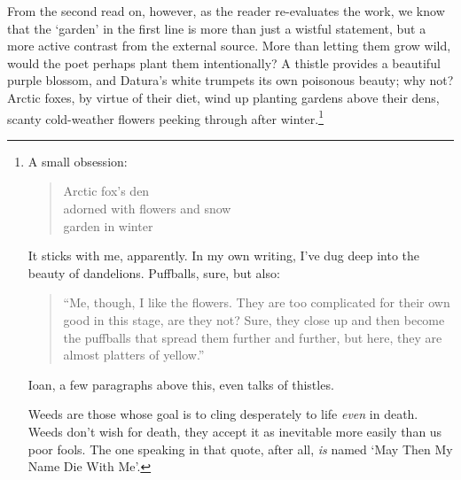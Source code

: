 \documentclass[12pt,oneside]{memoir}
\begin{document}
From the second read on, however, as the reader re-evaluates the work, we know that the `garden' in the first line is more than just a wistful statement, but a more active contrast from the external source. More than letting them grow wild, would the poet perhaps plant them intentionally? A thistle provides a beautiful purple blossom, and Datura's white trumpets its own poisonous beauty; why not? Arctic foxes, by virtue of their diet, wind up planting gardens above their dens, scanty cold-weather flowers peeking through after winter.\footnote{A small obsession:\begin{verse}Arctic fox's den \\
adorned with flowers and snow \\
garden in winter\par
\parencite{arkie}
\end{verse}\par
It sticks with me, apparently. In my own writing, I've dug deep into the beauty of dandelions. Puffballs, sure, but also:\begin{quote}
``Me, though, I like the flowers. They are too complicated for their own good in this stage, are they not? Sure, they close up and then become the puffballs that spread them further and further, but here, they are almost platters of yellow.''\par
\parencite[162]{toledot}\end{quote}\par
Ioan, a few paragraphs above this, even talks of thistles.\par
Weeds are those whose goal is to cling desperately to life \emph{even} in death. Weeds don't wish for death, they accept it as inevitable more easily than us poor fools. The one speaking in that quote, after all, \emph{is} named `May Then My Name Die With Me'.}
\end{document}
